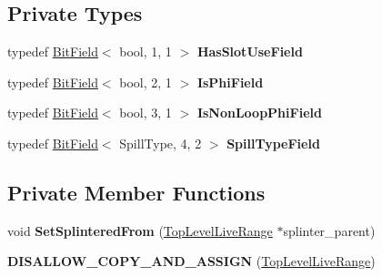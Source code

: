 \subsection*{Private Types}
\begin{DoxyCompactItemize}
\item 
typedef \hyperlink{classv8_1_1internal_1_1_bit_field}{Bit\+Field}$<$ bool, 1, 1 $>$ {\bfseries Has\+Slot\+Use\+Field}\hypertarget{classv8_1_1internal_1_1compiler_1_1_top_level_live_range_a6e0b6845c8d8c55901815f8b325e9c98}{}\label{classv8_1_1internal_1_1compiler_1_1_top_level_live_range_a6e0b6845c8d8c55901815f8b325e9c98}

\item 
typedef \hyperlink{classv8_1_1internal_1_1_bit_field}{Bit\+Field}$<$ bool, 2, 1 $>$ {\bfseries Is\+Phi\+Field}\hypertarget{classv8_1_1internal_1_1compiler_1_1_top_level_live_range_a59e1545fc3bb49fe62675d51af5d3a02}{}\label{classv8_1_1internal_1_1compiler_1_1_top_level_live_range_a59e1545fc3bb49fe62675d51af5d3a02}

\item 
typedef \hyperlink{classv8_1_1internal_1_1_bit_field}{Bit\+Field}$<$ bool, 3, 1 $>$ {\bfseries Is\+Non\+Loop\+Phi\+Field}\hypertarget{classv8_1_1internal_1_1compiler_1_1_top_level_live_range_a7fa94004ce973597923df4c38ddf4aea}{}\label{classv8_1_1internal_1_1compiler_1_1_top_level_live_range_a7fa94004ce973597923df4c38ddf4aea}

\item 
typedef \hyperlink{classv8_1_1internal_1_1_bit_field}{Bit\+Field}$<$ Spill\+Type, 4, 2 $>$ {\bfseries Spill\+Type\+Field}\hypertarget{classv8_1_1internal_1_1compiler_1_1_top_level_live_range_a3ce9625b6c28ee98ca91ed6b270be3e8}{}\label{classv8_1_1internal_1_1compiler_1_1_top_level_live_range_a3ce9625b6c28ee98ca91ed6b270be3e8}

\end{DoxyCompactItemize}
\subsection*{Private Member Functions}
\begin{DoxyCompactItemize}
\item 
void {\bfseries Set\+Splintered\+From} (\hyperlink{classv8_1_1internal_1_1compiler_1_1_top_level_live_range}{Top\+Level\+Live\+Range} $\ast$splinter\+\_\+parent)\hypertarget{classv8_1_1internal_1_1compiler_1_1_top_level_live_range_abe721dfd3ee02648132f4f5fa040fe19}{}\label{classv8_1_1internal_1_1compiler_1_1_top_level_live_range_abe721dfd3ee02648132f4f5fa040fe19}

\item 
{\bfseries D\+I\+S\+A\+L\+L\+O\+W\+\_\+\+C\+O\+P\+Y\+\_\+\+A\+N\+D\+\_\+\+A\+S\+S\+I\+GN} (\hyperlink{classv8_1_1internal_1_1compiler_1_1_top_level_live_range}{Top\+Level\+Live\+Range})\hypertarget{classv8_1_1internal_1_1compiler_1_1_top_level_live_range_ab27f0f8e0d90b2b5180bf79c0c1dcba8}{}\label{classv8_1_1internal_1_1compiler_1_1_top_level_live_range_ab27f0f8e0d90b2b5180bf79c0c1dcba8}

\end{DoxyCompactItemize}
